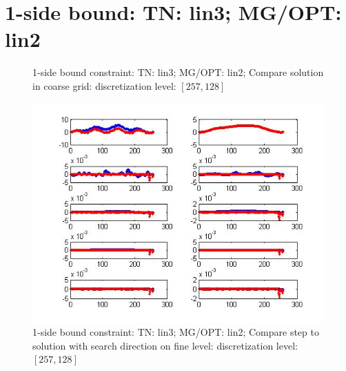 \documentclass[10pt]{article}
\begin{document}
\section{1-side bound: TN: lin3; MG/OPT: lin2}

\begin{figure}[H]
  \centering
  \caption{1-side bound constraint:   TN: lin3; MG/OPT: lin2; Compare solution in coarse grid: discretization level: $[257,128]$}
  \label{fig:coarse1s32}
\end{figure}

\begin{figure}
  \centering
  \includegraphics[width=1\textwidth]{finedir1s32}
  \caption{1-side bound constraint:  TN: lin3; MG/OPT: lin2; Compare step to solution with search direction on fine level: discretization level: $[257,128]$}
  \label{fig:fine1s32}
\end{figure}
\end{document}
